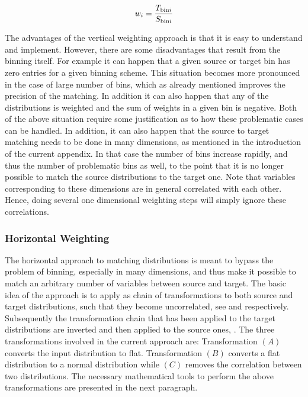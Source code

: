\begin{equation}
  \centering
  w_i = \frac{T_{{\rm bin}i}}{S_{{\rm bin}i}}
\label{vert_rew}
\end{equation}

The advantages of the vertical weighting approach is that it is easy to understand and implement.
However, there are some disadvantages that result from the binning itself. For example it can happen
that a given source or target bin has zero entries for a given binning scheme. This situation 
becomes more pronounced in the case of large number of bins, which as already mentioned improves the
precision of the matching. In addition it can also happen that any of the distributions is weighted and
the sum of weights in a given bin is negative. Both of the above situation require some justification
as to how these problematic cases can be handled. In addition, it can also happen that the source to
target matching needs to be done in many dimensions, as mentioned in the introduction of the current
appendix. In that case the number of bins increase rapidly, and thus the number of problematic bins as well,
to the point that it is no longer possible to match the source distributions to the target one.
Note that variables corresponding to these dimensions are in general correlated with each other.
Hence, doing several one dimensional weighting steps will simply ignore these correlations.

\subsubsection{Horizontal Weighting}
The horizontal approach to matching distributions is meant to bypass the problem of binning, especially in many dimensions,
and thus make it possible to match an arbitrary number of variables between source
and target. The basic idea of the approach is to apply as chain of transformations to both source and target
distributions, such that they become uncorrelated, see  and 
respectively. Subsequently the transformation chain that has been applied to the target distributions
are inverted and then applied to the source ones, . The three transformations
involved in the current approach are: Transformation $(A)$ converts the input distribution to flat.
Transformation $(B)$ converts a flat distribution to a normal distribution while $(C)$ removes
the correlation between two distributions. The necessary mathematical tools to perform the above transformations
are presented in the next paragraph.

